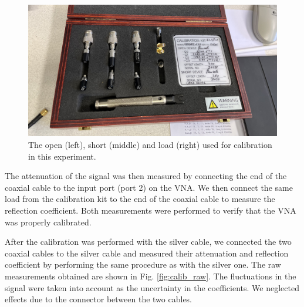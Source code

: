 \documentclass[a4paper]{article}
\numberwithin{equation}{section}
\begin{document}
\begin{figure}[hbt!]
	\centering
	\includegraphics[width=0.6\columnwidth]{calibration_kit.jpg}
	\caption{The open (left), short (middle) and load (right) used for
			calibration in this experiment.}

	\label{fig:calibration_kit}
\end{figure}

The attenuation of the signal was then measured by connecting the end of the
coaxial cable to the input port (port 2) on the VNA. We then connect the same
load from the calibration kit to the end of the coaxial cable to measure the
reflection coefficient. Both measurements were performed to verify that the VNA
was properly calibrated. \par 

After the calibration was performed with the silver cable, we connected the two
coaxial cables to the silver cable and measured their attenuation and reflection
coefficient by performing the same procedure as with the silver one. The raw
measurements obtained are shown in Fig.  \ref{fig:calib_raw}. The fluctuations in the signal were taken into account as the
uncertainty in the coefficients. We neglected effects due to the connector
between the two cables.
\end{document}
